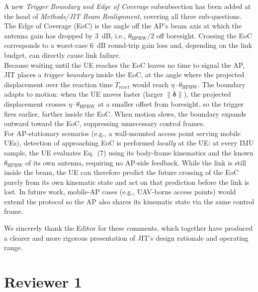 \documentclass{article}
\begin{document}
\noindent A new \emph{Trigger Boundary and Edge of Coverage} subsubsection has been added at the head of \emph{Methods/JIT Beam Realignment}, covering all three sub-questions.\\

\noindent The Edge of Coverage (EoC) is the angle off the AP's beam axis at which the antenna gain has dropped by \SI{3}{\deci\bel}, i.e., $\theta_{\text{HPBW}}/2$ off boresight. Crossing the EoC corresponds to a worst-case \SI{6}{\deci\bel} round-trip gain loss and, depending on the link budget, can directly cause link failure.\\

\noindent Because waiting until the UE reaches the EoC leaves no time to signal the AP, JIT places a \emph{trigger boundary} inside the EoC, at the angle where the projected displacement over the reaction time $T_{\text{react}}$ would reach $\eta \cdot \theta_{\text{HPBW}}$. The boundary adapts to motion: when the UE moves faster (larger $\|\dot{\boldsymbol\delta}\|$), the projected displacement crosses $\eta \cdot \theta_{\text{HPBW}}$ at a smaller offset from boresight, so the trigger fires earlier, farther inside the EoC. When motion slows, the boundary expands outward toward the EoC, suppressing unnecessary control frames.\\

\noindent For AP-stationary scenarios (e.g., a wall-mounted access point serving mobile UEs), detection of approaching EoC is performed \emph{locally} at the UE: at every IMU sample, the UE evaluates Eq.~(7) using its body-frame kinematics and the known $\theta_{\text{HPBW}}$ of its own antenna, requiring no AP-side feedback. While the link is still inside the beam, the UE can therefore predict the future crossing of the EoC purely from its own kinematic state and act on that prediction before the link is lost. In future work, mobile-AP cases (e.g., UAV-borne access points) would extend the protocol so the AP also shares its kinematic state via the same control frame.

\bigskip
\noindent We sincerely thank the Editor for these comments, which together have produced a clearer and more rigorous presentation of JIT's design rationale and operating range.

\newpage

\section*{Reviewer 1}
\end{document}
